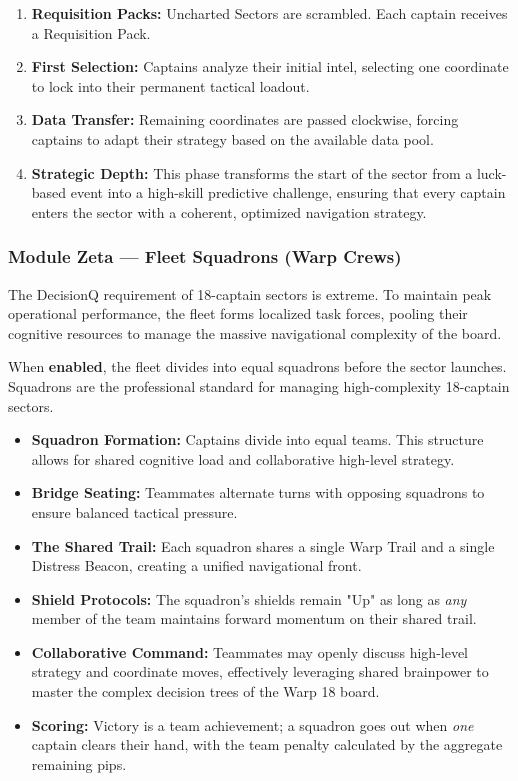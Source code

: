 \documentclass[11pt]{article}
\providecommand{\tightlist}{%
  \setlength{\itemsep}{0pt}\setlength{\parskip}{0pt}}
\begin{document}
\begin{enumerate}
\def\labelenumi{\arabic{enumi}.}
\tightlist
\item
  \textbf{Requisition Packs:} Uncharted Sectors are scrambled. Each
  captain receives a Requisition Pack.
\item
  \textbf{First Selection:} Captains analyze their initial intel,
  selecting one coordinate to lock into their permanent tactical
  loadout.
\item
  \textbf{Data Transfer:} Remaining coordinates are passed clockwise,
  forcing captains to adapt their strategy based on the available data
  pool.
\item
  \textbf{Strategic Depth:} This phase transforms the start of the
  sector from a luck-based event into a high-skill predictive challenge,
  ensuring that every captain enters the sector with a coherent,
  optimized navigation strategy.
\end{enumerate}

\subsubsection{Module Zeta --- Fleet Squadrons (Warp
Crews)}\label{module-zeta--fleet-squadrons-warp-crews}

The DecisionQ requirement of 18-captain sectors is extreme. To maintain
peak operational performance, the fleet forms localized task forces,
pooling their cognitive resources to manage the massive navigational
complexity of the board.

When \textbf{enabled}, the fleet divides into equal squadrons before the
sector launches. Squadrons are the professional standard for managing
high-complexity 18-captain sectors.

\begin{itemize}
\tightlist
\item
  \textbf{Squadron Formation:} Captains divide into equal teams. This
  structure allows for shared cognitive load and collaborative
  high-level strategy.
\item
  \textbf{Bridge Seating:} Teammates alternate turns with opposing
  squadrons to ensure balanced tactical pressure.
\item
  \textbf{The Shared Trail:} Each squadron shares a single Warp Trail
  and a single Distress Beacon, creating a unified navigational front.
\item
  \textbf{Shield Protocols:} The squadron's shields remain "Up" as long
  as \emph{any} member of the team maintains forward momentum on their
  shared trail.
\item
  \textbf{Collaborative Command:} Teammates may openly discuss
  high-level strategy and coordinate moves, effectively leveraging
  shared brainpower to master the complex decision trees of the Warp 18
  board.
\item
  \textbf{Scoring:} Victory is a team achievement; a squadron goes out
  when \emph{one} captain clears their hand, with the team penalty
  calculated by the aggregate remaining pips.
\end{itemize}
\end{document}
